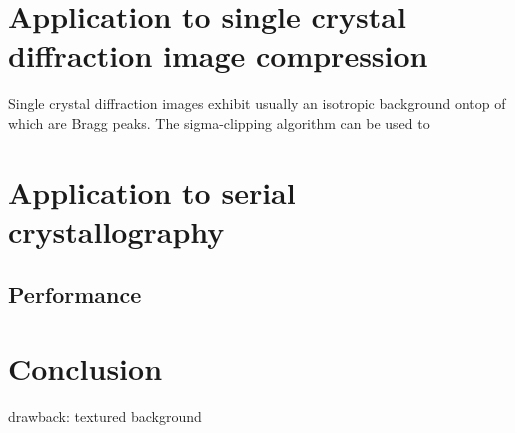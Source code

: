 \documentclass[preprint]{iucr}              %
\begin{document}
\section{Application to single crystal diffraction image compression}
Single crystal diffraction images exhibit usually an isotropic background ontop of which are Bragg peaks.
The sigma-clipping algorithm can be used to   

\section{Application to serial crystallography}

\subsection{Performance}
\section{Conclusion}
drawback: textured background








\end{document}
